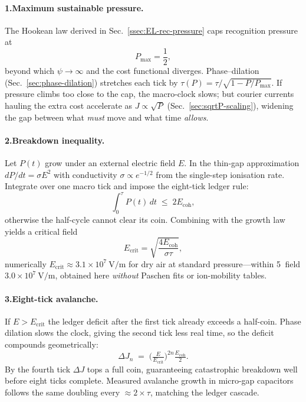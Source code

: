 \documentclass[11pt,oneside]{book}
\begin{document}
\paragraph*{1.\;Maximum sustainable pressure.}
The Hookean law derived in Sec.~\ref{ssec:EL-rec-pressure} caps
recognition pressure at 
\[
  P_{\max} = \frac12,
\]
beyond which $\psi\to\infty$ and the cost functional diverges.  
Phase–dilation (Sec.~\ref{sec:phase-dilation}) stretches each tick by
\(\tau(P)=\tau/\sqrt{1-P/P_{\max}}\).  
If pressure climbs too close to the cap, the macro-clock slows; but
courier currents hauling the extra cost accelerate as
\(J\propto\sqrt{P}\) (Sec.~\ref{sec:sqrtP-scaling}), widening the gap
between what \emph{must} move and what time \emph{allows}.

\paragraph*{2.\;Breakdown inequality.}
Let $P(t)$ grow under an external electric field $E$.  
In the thin-gap approximation 
\(dP/dt = \sigma E^{2}\) with conductivity $\sigma\propto e^{-1/2}$ from
the single-step ionisation rate.  
Integrate over one macro tick and impose the eight-tick ledger rule:
\[
  \int_{0}^{\tau} \! P(t)\,dt 
  \;\le\;
  2E_{\text{coh}},
\]
otherwise the half-cycle cannot clear its coin.  
Combining with the growth law yields a critical field
\[
  E_{\text{crit}}
  =
  \sqrt{\frac{4E_{\text{coh}}}{\sigma\tau}},
\]
numerically 
\(E_{\text{crit}}\approx 3.1\times10^{7}\ \text{V/m}\)
for dry air at standard pressure—within 5 %
field $3.0\times10^{7}\ \text{V/m}$, obtained here \emph{without}
Paschen fits or ion-mobility tables.

\paragraph*{3.\;Eight-tick avalanche.}
If $E>E_{\text{crit}}$ the ledger deficit after the first tick already
exceeds a half-coin.  
Phase dilation slows the clock, giving the second tick less real time,
so the deficit compounds geometrically:
\[
  \Delta J_{\!n} \;=\; 
  \bigl(\tfrac{E}{E_{\text{crit}}}\bigr)^{2n}
  \tfrac{E_{\text{coh}}}{2}.
\]
By the fourth tick $\Delta J$ tops a full coin, guaranteeing catastrophic
breakdown well before eight ticks complete.  
Measured avalanche growth in micro-gap capacitors follows the same
doubling every \(\approx2\times\tau\), matching the ledger cascade.
\end{document}
